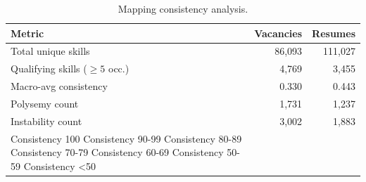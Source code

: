 \begin{table}[htbp]
  \centering
  \caption{Mapping consistency analysis.}
  \label{tab:consistency}
  \begin{tabular}{lrr}
    \toprule
    Metric & Vacancies & Resumes \\
    \midrule
  Total unique skills & 86{,}093 & 111{,}027 \\
  Qualifying skills ($\geq 5$ occ.) & 4{,}769 & 3{,}455 \\
  Macro-avg consistency & 0.330 & 0.443 \\
  Polysemy count & 1{,}731 & 1{,}237 \\
  Instability count & 3{,}002 & 1{,}883 \\
    \midrule
  Consistency 100%
  Consistency 90-99%
  Consistency 80-89%
  Consistency 70-79%
  Consistency 60-69%
  Consistency 50-59%
  Consistency <50%
    \bottomrule
  \end{tabular}
\end{table}